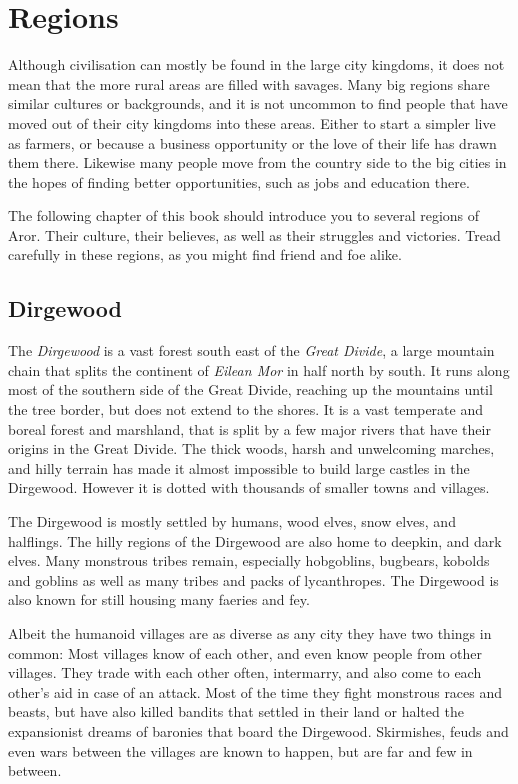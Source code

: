 \section{Regions}

Although civilisation can mostly be found in the large city kingdoms, it does
not mean that the more rural areas are filled with savages. Many big regions
share similar cultures or backgrounds, and it is not uncommon to find people
that have moved out of their city kingdoms into these areas. Either to start a
simpler live as farmers, or because a business opportunity or the love of
their life has drawn them there.  Likewise many people move from the country
side to the big cities in the hopes of finding better opportunities, such as
jobs and education there.

The following chapter of this book should introduce you to several regions of
Aror. Their culture, their believes, as well as their struggles and victories.
Tread carefully in these regions, as you might find friend and foe alike.

\subsection{Dirgewood}

The \emph{Dirgewood} is a vast forest south east of the \emph{Great Divide}, a
large mountain chain that splits the continent of \emph{Eilean Mor} in half
north by south. It runs along most of the southern side of the Great Divide,
reaching up the mountains until the tree border, but does not extend to the
shores. It is a vast temperate and boreal forest and marshland, that is split
by a few major rivers that have their origins in the Great Divide. The thick
woods, harsh and unwelcoming marches, and hilly terrain has made it almost
impossible to build large castles in the Dirgewood. However it is dotted with
thousands of smaller towns and villages.

The Dirgewood is mostly settled by humans, wood elves, snow elves, and
halflings. The hilly regions of the Dirgewood are also home to deepkin, and
dark elves. Many monstrous tribes remain, especially hobgoblins, bugbears,
kobolds and goblins as well as many tribes and packs of lycanthropes. The
Dirgewood is also known for still housing many faeries and fey.

Albeit the humanoid villages are as diverse as any city they have two things
in common: Most villages know of each other, and even know people from other
villages. They trade with each other often, intermarry, and also come to each
other's aid in case of an attack. Most of the time they fight monstrous races
and beasts, but have also killed bandits that settled in their land or halted
the expansionist dreams of baronies that board the Dirgewood. Skirmishes,
feuds and even wars between the villages are known to happen, but are far and
few in between.

